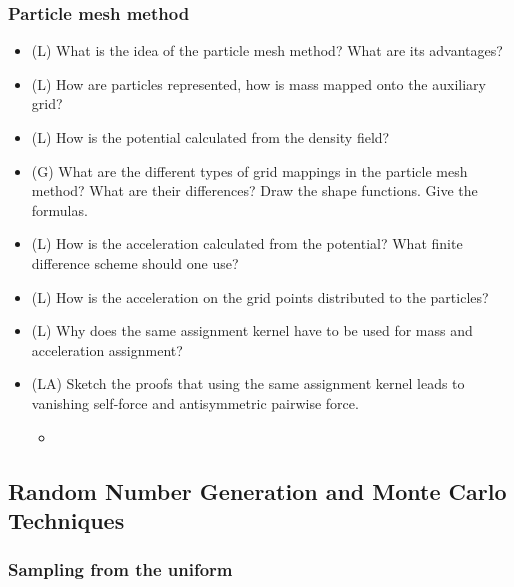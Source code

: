 \subsubsection*{Particle mesh method}
\begin{itemize}
    \item (L) What is the idea of the particle mesh method? What are its advantages?
    \answerboxM
    \item (L) How are particles represented, how is mass mapped onto the auxiliary grid?
    \answerboxM
    \item (L) How is the potential calculated from the density field?
    \answerboxM
    \item (G) What are the different types of grid mappings in the particle mesh method? What are their
    differences? Draw the shape functions. Give the formulas.
    \answerboxL
    \item (L) How is the acceleration calculated from the potential? What finite difference scheme should one use?
    \answerboxM
    \item (L) How is the acceleration on the grid points distributed to the particles?
    \answerboxM
    \item (L) Why does the same assignment kernel have to be used for mass and acceleration assignment?
    \answerboxM
    \item (LA) Sketch the proofs that using the same assignment kernel leads to vanishing self-force and
    antisymmetric pairwise force.
    \begin{itemize}
        \item {}
    \end{itemize}
    \answerboxL
\end{itemize}

\subsection*{Random Number Generation and Monte Carlo Techniques}

\subsubsection*{Sampling from the uniform}

